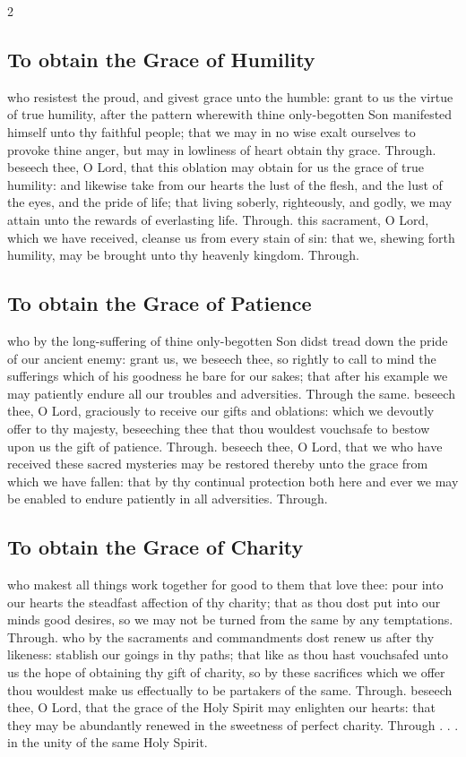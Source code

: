 \begin{multicols}{2}
\subsection{To obtain the Grace of Humility}
\collect
{} who resistest the proud, and givest grace unto the humble: grant to us the virtue of true humility, after the pattern wherewith thine only-begotten Son manifested himself unto thy faithful people; that we may in no wise exalt ourselves to provoke thine anger, but may in lowliness of heart obtain thy grace. Through.
\secret
{} beseech thee, O Lord, that this oblation may obtain for us the grace of true humility: and likewise take from our hearts the lust of the flesh, and the lust of the eyes, and the pride of life; that living soberly, righteously, and godly, we may attain unto the rewards of everlasting life. Through.
\postcommunion
{} this sacrament, O Lord, which we have received, cleanse us from every stain of sin: that we, shewing forth humility, may be brought unto thy heavenly kingdom. Through.

\subsection{To obtain the Grace of Patience}
\collect
{} who by the long-suffering of thine only-begotten Son didst tread down the pride of our ancient enemy: grant us, we beseech thee, so rightly to call to mind the sufferings which of his goodness he bare for our sakes; that after his example we may patiently endure all our troubles and adversities. Through the same.
\secret
{} beseech thee, O Lord, graciously to receive our gifts and oblations: which we devoutly offer to thy majesty, beseeching thee that thou wouldest vouchsafe to bestow upon us the gift of patience. Through.
\postcommunion
{} beseech thee, O Lord, that we who have received these sacred mysteries may be restored thereby unto the grace from which we have fallen: that by thy continual protection both here and ever we may be enabled to endure patiently in all adversities. Through.

\subsection{To obtain the Grace of Charity}
\collect
{} who makest all things work together for good to them that love thee: pour into our hearts the steadfast affection of thy charity; that as thou dost put into our minds good desires, so we may not be turned from the same by any temptations. Through.
\secret
{} who by the sacraments and commandments dost renew us after thy likeness: stablish our goings in thy paths; that like as thou hast vouchsafed unto us the hope of obtaining thy gift of charity, so by these sacrifices which we offer thou wouldest make us effectually to be partakers of the same. Through.
\postcommunion
{} beseech thee, O Lord, that the grace of the Holy Spirit may enlighten our hearts: that they may be abundantly renewed in the sweetness of perfect charity. Through . . . in the unity of the same Holy Spirit.


\end{multicols}
